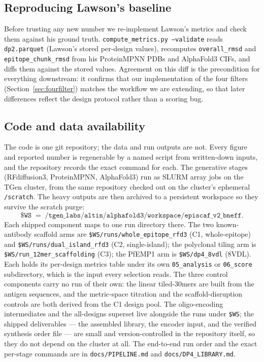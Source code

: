 \subsection{Reproducing Lawson's baseline}\label{sec:repro}
Before trusting any new number we re-implement Lawson's metrics and check them against his
ground truth. \texttt{compute\_metrics.py --validate} reads \texttt{dp2.parquet} (Lawson's
stored per-design values), recomputes \texttt{overall\_rmsd} and
\texttt{epitope\_chunk\_rmsd} from his ProteinMPNN PDBs and AlphaFold3 CIFs, and diffs them
against the stored values. Agreement on this diff is the precondition for everything
downstream: it confirms that our implementation of the four filters
(Section~\ref{sec:fourfilter}) matches the workflow we are extending, so that later
differences reflect the design protocol rather than a scoring bug.

\subsection{Code and data availability}\label{sec:availability}
The code is one git repository; the data and run outputs are not. Every figure and reported
number is regenerable by a named script from written-down inputs, and the repository records the
exact command for each. The generative stages (RFdiffusion3, ProteinMPNN, AlphaFold3) run as SLURM
array jobs on the TGen cluster, from the same repository checked out on the cluster's ephemeral
\texttt{/scratch}. The heavy outputs are then archived to a persistent workspace so they survive the
scratch purge:
\[
\texttt{\$WS} \;=\; \texttt{/tgen\_labs/altin/alphafold3/workspace/episcaf\_v2\_bneff}.
\]
Each shipped component maps to one run directory there. The two known-antibody scaffold arms are
\texttt{\$WS/runs/whole\_epitope\_rfd3} (C1, whole-epitope) and \texttt{\$WS/runs/dual\_island\_rfd3}
(C2, single-island); the polyclonal tiling arm is \texttt{\$WS/run\_12mer\_scaffolding} (C3); the
PfEMP1 arm is \texttt{\$WS/dp4\_8vdl} (8VDL). Each holds its per-design metrics table under its own
\texttt{05\_analysis} or \texttt{06\_score} subdirectory, which is the input every selection reads. The
three control components carry no run of their own: the linear tiled-30mers are built from the antigen
sequences, and the metric-space titration and the scaffold-disruption controls are both derived from the
C1 design pool. The oligo-encoding intermediates and the all-designs superset live alongside the runs
under \texttt{\$WS}; the shipped deliverables --- the assembled library, the encoder input, and the
verified synthesis order file --- are small and version-controlled in the repository itself, so they do
not depend on the cluster at all. The end-to-end run order and the exact per-stage commands are in
\texttt{docs/PIPELINE.md} and \texttt{docs/DP4\_LIBRARY.md}.
